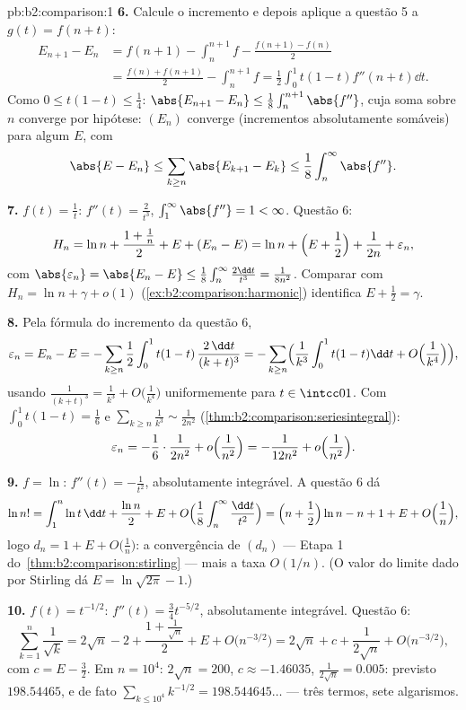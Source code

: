 \begin{solution}{pb:b2:comparison:1}
\textbf{6.} Calcule o incremento e depois aplique a questão 5 a
$g(t) = f(n + t)$:
\begin{align*}
E_{n+1} - E_n
&= f(n{+}1) - \int_n^{n+1}\!f - \frac{f(n{+}1) - f(n)}2 \\
&= \frac{f(n) + f(n{+}1)}2 - \int_n^{n+1}\!f
= \frac12\int_0^1 t(1-t)f''(n+t)\dd t .
\end{align*}
Como $0 \leq t(1-t) \leq \frac14$: $\abs{E_{n+1} - E_n} \leq
\frac18\int_n^{n+1}\abs{f''}$, cuja soma sobre $n$ converge por
hipótese: $(E_n)$ converge (incrementos absolutamente somáveis)
para algum $E$, com
\[
\abs{E - E_n} \leq \sum_{k\geq n}\abs{E_{k+1} - E_k} \leq
\frac18\int_n^\infty\abs{f''} .
\]

\textbf{7.} $f(t) = \frac1t$: $f''(t) = \frac2{t^3}$,
$\int_1^\infty\abs{f''} = 1 < \infty$. Questão 6:
\[
H_n = \ln n + \frac{1 + \frac1n}{2} + E + (E_n - E)
= \ln n + \Bigl(E + \frac12\Bigr) + \frac1{2n} +
\varepsilon_n,
\]
com $\abs{\varepsilon_n} = \abs{E_n - E} \leq
\frac18\int_n^\infty\frac{2\dd t}{t^3} = \frac1{8n^2}$.
Comparar com $H_n = \ln n + \gamma + o(1)$
(\cref{ex:b2:comparison:harmonic}) identifica $E + \frac12 =
\gamma$.

\textbf{8.} Pela fórmula do incremento da questão 6,
\[
\varepsilon_n = E_n - E = -\sum_{k\geq n}\frac12\int_0^1
t(1-t)\,\frac{2\,\dd t}{(k+t)^3}
= -\sum_{k \geq n}\Bigl(\frac1{k^3}\int_0^1t(1-t)\dd t +
O\Bigl(\frac1{k^4}\Bigr)\Bigr),
\]
usando $\frac{1}{(k+t)^3} = \frac1{k^3} +
O\bigl(\frac1{k^4}\bigr)$ uniformemente para $t \in \intcc01$. Com
$\int_0^1 t(1-t) = \frac16$ e
$\sum_{k\geq n}\frac1{k^3} \sim \frac{1}{2n^2}$
(\cref{thm:b2:comparison:seriesintegral}):
\[
\varepsilon_n = -\frac16\cdot\frac{1}{2n^2} +
o\Bigl(\frac1{n^2}\Bigr) = -\frac{1}{12n^2} +
o\Bigl(\frac{1}{n^2}\Bigr).
\]

\textbf{9.} $f = \ln$: $f''(t) = -\frac1{t^2}$, absolutamente
integrável. A questão 6 dá
\[
\ln n! = \int_1^n\ln t\,\dd t + \frac{\ln n}2 + E + O\Bigl(
\frac1{8}\int_n^\infty\frac{\dd t}{t^2}\Bigr)
= \Bigl(n + \frac12\Bigr)\ln n - n + 1 + E +
O\Bigl(\frac1n\Bigr),
\]
logo $d_n = 1 + E + O\bigl(\frac1n\bigr)$: a convergência de $(d_n)$
--- Etapa 1 do~\cref{thm:b2:comparison:stirling} --- mais a
taxa $O(1/n)$. (O valor do limite dado por Stirling dá $E =
\ln\sqrt{2\pi} - 1$.)

\textbf{10.} $f(t) = t^{-1/2}$: $f''(t) = \frac34 t^{-5/2}$,
absolutamente integrável. Questão 6:
\[
\sum_{k=1}^n \frac1{\sqrt k}
= 2\sqrt n - 2 + \frac{1 + \frac1{\sqrt n}}2 + E +
O\bigl(n^{-3/2}\bigr)
= 2\sqrt n + c + \frac{1}{2\sqrt n} +
O\bigl(n^{-3/2}\bigr),
\]
com $c = E - \frac32$. Em $n = 10^4$: $2\sqrt n = 200$, $c
\approx -1.46035$, $\frac1{2\sqrt n} = 0.005$: previsto
$198.54465$, e de fato $\sum_{k\leq10^4}k^{-1/2} =
198.544645\dots$ --- três termos, sete algarismos.


\end{solution}
